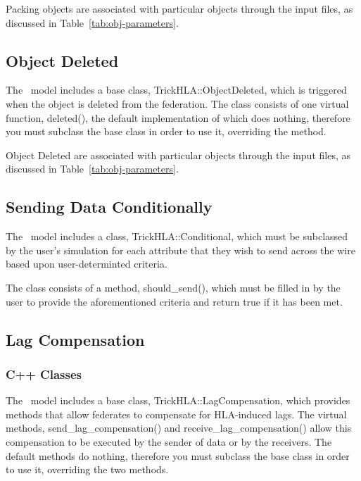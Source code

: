 Packing objects are associated with particular objects through the
input files, as discussed in
Table~\ref{tab:obj-parameters}.

\subsection{Object Deleted}

The \TrickHLA\ model includes a base class,
{\ttfamily TrickHLA::ObjectDeleted},
which is triggered when the object is deleted from the federation.
The class consists of one virtual function,
{\ttfamily deleted()}, the default implementation of which does nothing,
therefore you must subclass the base class in order to use it,
overriding the method.

Object Deleted are associated with particular objects through the
input files, as discussed in
Table~\ref{tab:obj-parameters}.

\subsection{Sending Data Conditionally}

The \TrickHLA\ model includes a class,
{\ttfamily TrickHLA::Conditional},
which must be subclassed by the user's simulation for each attribute that they
wish to send across the wire based upon user-determinted criteria.

The class consists of a method, {\ttfamily should\_send()}, which must be filled
in by the user to provide the aforementioned criteria and return true if it has
been met.

\subsection{Lag Compensation}

\subsubsection{C++ Classes}
The \TrickHLA\ model includes a base class,
{\ttfamily TrickHLA::LagCompensation},
which provides methods that allow federates to compensate for
HLA-induced lags.
The virtual methods,
{\ttfamily send\_lag\_compensation()} and
{\ttfamily receive\_lag\_compensation()}
allow this compensation to be executed by the sender of data or by
the receivers.
The default methods do nothing,
therefore you must subclass the base class in order to use it,
overriding the two methods.

